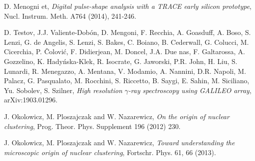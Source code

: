 \begin{thebibliography}{20}

  D. Menogni et,
  \emph{Digital pulse-shape analysis with a TRACE early silicon prototype}, Nucl. Instrum. Meth. A764 (2014), 241-246.

  D. Testov, J.J. Valiente-Dobón, D. Mengoni, F. Recchia, A. Goasduff, A. Boso, S. Lenzi, G. de Angelis, S. Lenzi, S. Bakes, C. Boiano, B. Cederwall, G. Colucci, M. Cicerchia, P. Čolović, F. Didierjean, M. Doncel, J.A. Due {n}as, F. Galtarossa, A. Gozzelino, K. Hadyńska-Klek, R. Isocrate, G. Jaworski, P.R. John, H. Liu, S. Lunardi, R. Menegazzo, A. Mentana, V. Modamio, A. Nannini, D.R. Napoli, M. Palacz, G. Pasqualato, M. Rocchini, S. Riccetto, B. Saygi, E. Sahin, M. Siciliano, Yu. Sobolev, S. Szilner,
  \emph{High resolution $\gamma$-ray spectroscopy using GALILEO array}, arXiv:1903.01296.
  
  J. Okolowicz, M. Ploszajczak and W. Nazarewicz,
  \emph{On the origin of nuclear clustering}, Prog. Theor. Phys. Supplement 196 (2012) 230.

  J. Okolowicz, M. Ploszajczak and W. Nazarewicz,
  \emph{Toward understanding the microscopic origin of nuclear clustering}, Fortschr. Phys. 61, 66 (2013).
  
\end{thebibliography}
